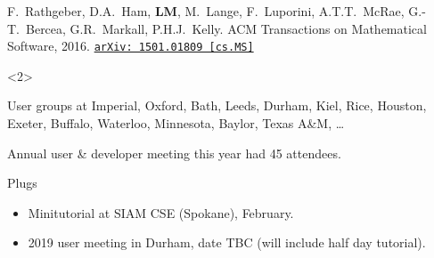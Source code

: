 \documentclass[presentation, 10pt]{beamer}
\newcommand{\arxivlink}[2]{%
  \href{http://www.arxiv.org/abs/#1}%
  {\texttt{arXiv:\,#1\,[#2]}}%
}
\begin{document}
\begin{frame}
\begin{overlayarea}{\textwidth}{0.8\textheight}
\begin{onlyenv}
    \begin{flushright}
      {\scriptsize F.~Rathgeber, D.A.~Ham, \textbf{LM}, M.~Lange,
        F.~Luporini, A.T.T.~McRae, G.-T.~Bercea, G.R.~Markall,
        P.H.J.~Kelly. ACM Transactions on Mathematical Software,
        2016. \arxivlink{1501.01809}{cs.MS}\nocite{Rathgeber:2016}}
    \end{flushright}
  \end{onlyenv}
  \begin{onlyenv}<2>
    \begin{block}{User groups at}
      Imperial, Oxford, Bath, Leeds, Durham, Kiel, Rice, Houston,
      Exeter, Buffalo, Waterloo, Minnesota, Baylor, Texas A\&M, \dots

      Annual user \& developer meeting this year had 45 attendees.
    \end{block}
    \begin{block}{Plugs}
      \begin{itemize}
      \item Minitutorial at SIAM CSE (Spokane), February.
      \item 2019 user meeting in Durham, date TBC (will include half day tutorial).
      \end{itemize}
    \end{block}
  \end{onlyenv}
\end{overlayarea}
\end{frame}
\end{document}
